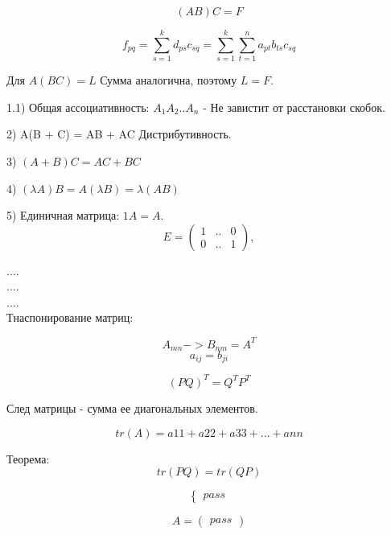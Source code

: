 \documentclass[a4paper]{article}
\begin{document}
$$(A B) C = F$$

$$f_{pq} = \sum^k_{s=1}d_{ps}c_{sq} = \sum^k_{s=1}\sum^n_{t=1}a_{pt}b_{ts}c_{sq}$$


Для $A (B C) = L$ Сумма аналогична, поэтому $L = F$.

1.1) Общая ассоциативность: $A_1A_2..A_n$ - Не завистит от расстановки скобок.


2) A(B + C) = AB + AC Дистрибутивность.


3) $(A + B)C = AC + BC$


4) $(\lambda A)B = A(\lambda B) = \lambda (AB)$



5) Единичная матрица: $ 1A = A$.
\begin{equation*}
E =  
\begin{pmatrix}
   1 & .. & 0\\
     0& ..&  1
\end{pmatrix},
\end{equation*}



....\\
....\\
....\\


Тнаспонирование матриц:

$$A_{mn} -> B_{nm} = A^T$$
$$a_{ij} = b_{ji}$$

$$(PQ)^T = Q^TP^T$$

След матрицы - сумма ее диагональных элементов.

$$tr(A) = a{11} + a{22} + a{33} + ... + a{nn}$$

Теорема:
$$ tr(PQ) = tr(QP)$$



\begin{equation*}
 \begin{cases}
   
pass

 \end{cases}
\end{equation*}

\begin{equation*}
A = 
\begin{pmatrix}
  pass
\end{pmatrix}
\end{equation*}
\end{document}
